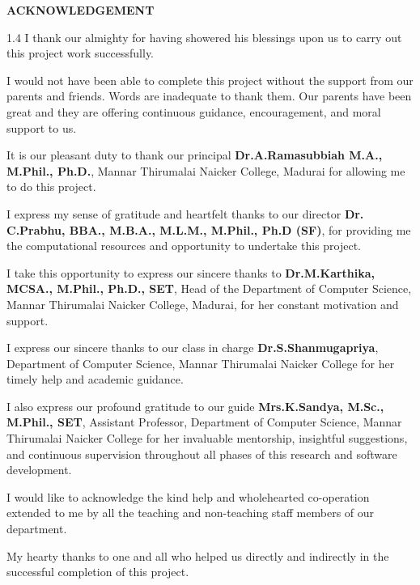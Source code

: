 \documentclass[12pt,a4paper]{article}
\begin{document}
\thispagestyle{empty}
\vspace*{0.5cm}
\begin{center}{\Large\bfseries ACKNOWLEDGEMENT}\end{center}
\vspace{0.5cm}
\begin{spacing}{1.4}
\setlength{\parskip}{8pt}
I thank our almighty for having showered his blessings upon us to carry out this project work successfully.

I would not have been able to complete this project without the support from our parents and friends. Words are inadequate to thank them. Our parents have been great and they are offering continuous guidance, encouragement, and moral support to us.

It is our pleasant duty to thank our principal \textbf{Dr.A.Ramasubbiah M.A., M.Phil., Ph.D.}, Mannar Thirumalai Naicker College, Madurai for allowing me to do this project.

I express my sense of gratitude and heartfelt thanks to our director \textbf{Dr. C.Prabhu, BBA., M.B.A., M.L.M., M.Phil., Ph.D (SF)}, for providing me the computational resources and opportunity to undertake this project.

I take this opportunity to express our sincere thanks to \textbf{Dr.M.Karthika, MCSA., M.Phil., Ph.D., SET}, Head of the Department of Computer Science, Mannar Thirumalai Naicker College, Madurai, for her constant motivation and support.

I express our sincere thanks to our class in charge \textbf{Dr.S.Shanmugapriya}, Department of Computer Science, Mannar Thirumalai Naicker College for her timely help and academic guidance.

I also express our profound gratitude to our guide \textbf{Mrs.K.Sandya, M.Sc., M.Phil., SET}, Assistant Professor, Department of Computer Science, Mannar Thirumalai Naicker College for her invaluable mentorship, insightful suggestions, and continuous supervision throughout all phases of this research and software development.

I would like to acknowledge the kind help and wholehearted co-operation extended to me by all the teaching and non-teaching staff members of our department.

My hearty thanks to one and all who helped us directly and indirectly in the successful completion of this project.
\end{spacing}
\clearpage
\end{document}
